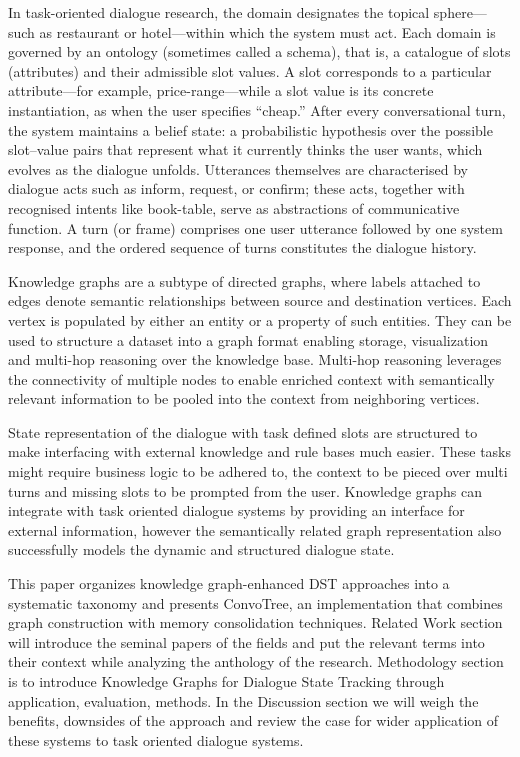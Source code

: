 \documentclass[11pt]{article}
\begin{document}
In task-oriented dialogue research, the domain designates the topical sphere—such as restaurant or hotel—within which the system must act. Each domain is governed by an ontology (sometimes called a schema), that is, a catalogue of slots (attributes) and their admissible slot values. A slot corresponds to a particular attribute—for example, price-range—while a slot value is its concrete instantiation, as when the user specifies “cheap.” After every conversational turn, the system maintains a belief state: a probabilistic hypothesis over the possible slot–value pairs that represent what it currently thinks the user wants, which evolves as the dialogue unfolds. Utterances themselves are characterised by dialogue acts such as inform, request, or confirm; these acts, together with recognised intents like book-table, serve as abstractions of communicative function. A turn (or frame) comprises one user utterance followed by one system response, and the ordered sequence of turns constitutes the dialogue history.

Knowledge graphs are a subtype of directed graphs, where labels attached to edges denote semantic relationships between source and destination vertices. Each vertex is populated by either an entity or a property of such entities. They can be used to structure a dataset into a graph format enabling storage, visualization and multi-hop reasoning over the knowledge base. Multi-hop reasoning leverages the connectivity of multiple nodes to enable enriched context with semantically relevant information to be pooled into the context from neighboring vertices. 

State representation of the dialogue with task defined slots are structured to make interfacing with external knowledge and rule bases much easier. These tasks might require business logic to be adhered to, the context to be pieced over multi turns and missing slots to be prompted from the user. Knowledge graphs can integrate with task oriented dialogue systems by providing an interface for external information, however the semantically related graph representation also successfully models the dynamic and structured dialogue state.

This paper organizes knowledge graph-enhanced DST approaches into a systematic taxonomy and presents ConvoTree, an implementation that combines graph construction with memory consolidation techniques. Related Work section will introduce the seminal papers of the fields and put the relevant terms into their context while analyzing the anthology of the research. Methodology section is to introduce Knowledge Graphs for Dialogue State Tracking through application, evaluation, methods. In the Discussion section we will weigh the benefits, downsides of the approach and review the case for wider application of these systems to task oriented dialogue systems.  
\end{document}
